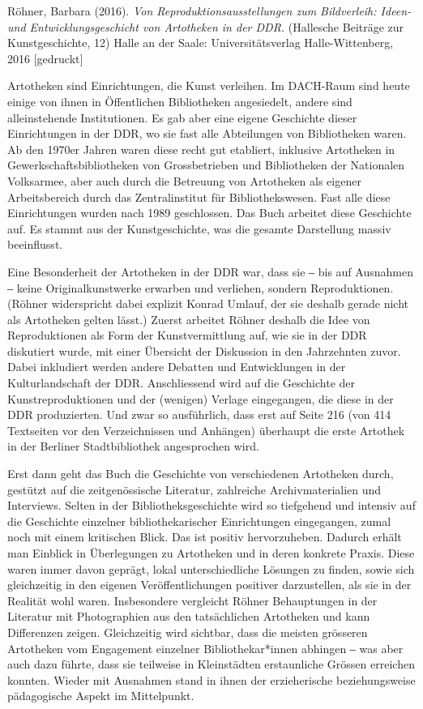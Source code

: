 \documentclass[a4paper,
fontsize=11pt,
oneside,
numbers=noperiodatend,
parskip=half-,
bibliography=totoc,
final
]{scrartcl}
\begin{document}
Röhner, Barbara (2016). \emph{Von Reproduktionsausstellungen zum
Bildverleih: Ideen- und Entwicklungsgeschicht von Artotheken in der
DDR.} (Hallesche Beiträge zur Kunstgeschichte, 12) Halle an der Saale:
Universitätsverlag Halle-Wittenberg, 2016 {[}gedruckt{]}

Artotheken sind Einrichtungen, die Kunst verleihen. Im DACH-Raum sind
heute einige von ihnen in Öffentlichen Bibliotheken angesiedelt, andere
sind alleinstehende Institutionen. Es gab aber eine eigene Geschichte
dieser Einrichtungen in der DDR, wo sie fast alle Abteilungen von
Bibliotheken waren. Ab den 1970er Jahren waren diese recht gut
etabliert, inklusive Artotheken in Gewerkschaftsbibliotheken von
Grossbetrieben und Bibliotheken der Nationalen Volksarmee, aber auch
durch die Betreuung von Artotheken als eigener Arbeitsbereich durch das
Zentralinstitut für Bibliothekswesen. Fast alle diese Einrichtungen
wurden nach 1989 geschlossen. Das Buch arbeitet diese Geschichte auf. Es
stammt aus der Kunstgeschichte, was die gesamte Darstellung massiv
beeinflusst.

Eine Besonderheit der Artotheken in der DDR war, dass sie ‒ bis auf
Ausnahmen ‒ keine Originalkunstwerke erwarben und verliehen, sondern
Reproduktionen. (Röhner widerspricht dabei explizit Konrad Umlauf, der
sie deshalb gerade nicht als Artotheken gelten lässt.) Zuerst arbeitet
Röhner deshalb die Idee von Reproduktionen als Form der Kunstvermittlung
auf, wie sie in der DDR diskutiert wurde, mit einer Übersicht der
Diskussion in den Jahrzehnten zuvor. Dabei inkludiert werden andere
Debatten und Entwicklungen in der Kulturlandschaft der DDR.
Anschliessend wird auf die Geschichte der Kunstreproduktionen und der
(wenigen) Verlage eingegangen, die diese in der DDR produzierten. Und
zwar so ausführlich, dass erst auf Seite 216 (von 414 Textseiten vor den
Verzeichnissen und Anhängen) überhaupt die erste Artothek in der
Berliner Stadtbibliothek angesprochen wird.

Erst dann geht das Buch die Geschichte von verschiedenen Artotheken
durch, gestützt auf die zeitgenössische Literatur, zahlreiche
Archivmaterialien und Interviews. Selten in der Bibliotheksgeschichte
wird so tiefgehend und intensiv auf die Geschichte einzelner
bibliothekarischer Einrichtungen eingegangen, zumal noch mit einem
kritischen Blick. Das ist positiv hervorzuheben. Dadurch erhält man
Einblick in Überlegungen zu Artotheken und in deren konkrete Praxis.
Diese waren immer davon geprägt, lokal unterschiedliche Lösungen zu
finden, sowie sich gleichzeitig in den eigenen Veröffentlichungen
positiver darzustellen, als sie in der Realität wohl waren. Insbesondere
vergleicht Röhner Behauptungen in der Literatur mit Photographien aus
den tatsächlichen Artotheken und kann Differenzen zeigen. Gleichzeitig
wird sichtbar, dass die meisten grösseren Artotheken vom Engagement
einzelner Bibliothekar*innen abhingen ‒ was aber auch dazu führte, dass
sie teilweise in Kleinstädten erstaunliche Grössen erreichen konnten.
Wieder mit Ausnahmen stand in ihnen der erzieherische beziehungsweise
pädagogische Aspekt im Mittelpunkt.
\end{document}
